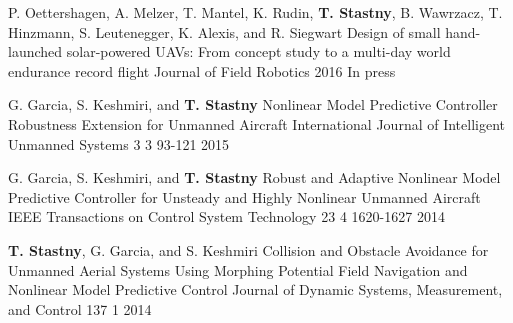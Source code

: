 

\begin{cventries}
\vspace{-2mm}

%	
%	
%	
\raggedright
{}

  \cvpubentry	
	{P. Oettershagen, A. Melzer, T. Mantel, K. Rudin, \textbf{T. Stastny}, B. Wawrzacz, T. Hinzmann, S. Leutenegger, K. Alexis, and R. Siegwart} %
	{Design of small hand-launched solar-powered UAVs: From concept study to a multi-day world endurance record flight} %
	{Journal of Field Robotics} %
	{} %
	{} %
	{} %
	{} %
	{2016} %
	{In press} %
		
  \cvpubentry	
	{G. Garcia, S. Keshmiri, and \textbf{T. Stastny}} %
	{Nonlinear Model Predictive Controller Robustness Extension for Unmanned Aircraft} %
	{International Journal of Intelligent Unmanned Systems} %
	{3} %
	{3} %
	{93-121} %
	{} %
	{2015} %
	{} %
	
  \cvpubentry	
	{G. Garcia, S. Keshmiri, and \textbf{T. Stastny}} %
	{Robust and Adaptive Nonlinear Model Predictive Controller for Unsteady and Highly Nonlinear Unmanned Aircraft} %
	{IEEE Transactions on Control System Technology} %
	{23} %
	{4} %
	{1620-1627} %
	{} %
	{2014} %
	{} %
	
  \cvpubentry	
	{\textbf{T. Stastny}, G. Garcia, and S. Keshmiri} %
	{Collision and Obstacle Avoidance for Unmanned Aerial Systems Using Morphing Potential Field Navigation and Nonlinear Model Predictive Control} %
	{Journal of Dynamic Systems, Measurement, and Control} %
	{137} %
	{1} %
	{} %
	{} %
	{2014} %
	{} %


\end{cventries}
